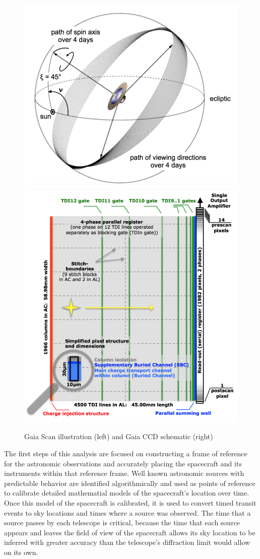 \documentclass[preprint2]{aastex631}
\begin{document}
\begin{figure}
	\includegraphics[width=0.49\columnwidth]{scanninglaw.png} \includegraphics[width=0.49\columnwidth]{gaiaccd.png}
	\caption{Gaia Scan illustration (left) and Gaia CCD schematic (right) \citep{collaborationGaia2016}}
	 \label{fig:scanninglaw} \label{fig:ccd}
\end{figure}
The first steps of this analysis are focused on constructing a frame of reference for the astronomic observations and accurately placing the spacecraft and its instruments within that reference frame. Well known astronomic sources with predictable behavior are identified algorithmically and used as points of reference to calibrate detailed mathematial models of the spacecraft's location over time. Once this model of the spacecraft is calibrated, it is used to convert timed transit events to sky locations and times where a source was observed. The time that a source passes by each telescope is critical, because the time that each source appears and leaves the field of view of the spacecraft allows its sky location to be inferred with greater accuracy than the telescope's diffraction limit would allow on its own.
\end{document}
